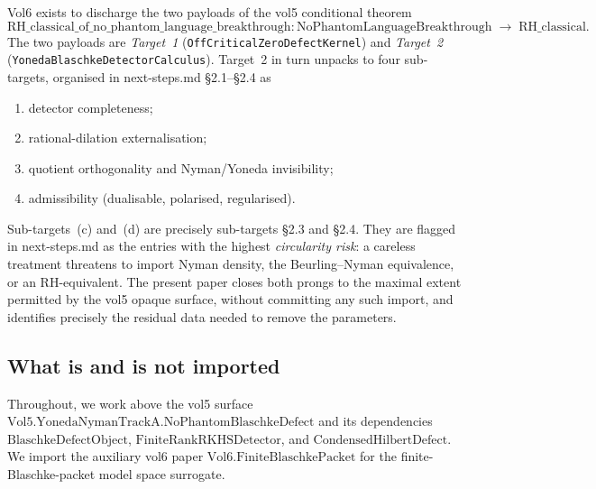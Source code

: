 \documentclass[12pt]{article}
\theoremstyle{definition}
\theoremstyle{remark}
\begin{document}
Vol6 exists to discharge the two payloads of the vol5 conditional theorem
\begin{equation}\label{eq:masterTheorem}
  \mathrm{RH\_classical\_of\_no\_phantom\_language\_breakthrough} :
    \mathrm{NoPhantomLanguageBreakthrough} \;\to\; \mathrm{RH\_classical}.
\end{equation}
The two payloads are \emph{Target~1} (\texttt{OffCriticalZeroDefectKernel}) and \emph{Target~2} (\texttt{YonedaBlaschkeDetectorCalculus}). Target~2 in turn unpacks to four sub-targets, organised in next-steps.md \S2.1--\S2.4 as
\begin{enumerate}[label=(\alph*)]
  \item detector completeness;
  \item rational-dilation externalisation;
  \item quotient orthogonality and Nyman/Yoneda invisibility;
  \item admissibility (dualisable, polarised, regularised).
\end{enumerate}
Sub-targets~(c) and~(d) are precisely sub-targets \S2.3 and \S2.4. They are flagged in next-steps.md as the entries with the highest \emph{circularity risk}: a careless treatment threatens to import Nyman density, the Beurling--Nyman equivalence, or an RH-equivalent. The present paper closes both prongs to the maximal extent permitted by the vol5 opaque surface, without committing any such import, and identifies precisely the residual data needed to remove the parameters.

\subsection{What is and is not imported}

Throughout, we work above the vol5 surface
$\mathrm{Vol5.YonedaNymanTrackA.NoPhantomBlaschkeDefect}$ and its dependencies
$\mathrm{BlaschkeDefectObject}$, $\mathrm{FiniteRankRKHSDetector}$, and $\mathrm{CondensedHilbertDefect}$. We import the auxiliary vol6 paper $\mathrm{Vol6.FiniteBlaschkePacket}$ for the finite-Blaschke-packet model space surrogate.
\end{document}

